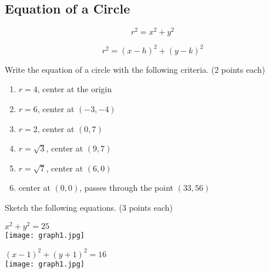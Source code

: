\documentclass[12pt]{article}
\begin{document}
\pagebreak

\subsection*{Equation of a Circle}

$$r^2=x^2+y^2$$

$$r^2=(x-h)^2+(y-k)^2$$

Write the equation of a circle with the following criteria. (2 points each)\\

\begin{enumerate}[resume]

	\item $r=4$, center at the origin\\
	
	\item $r=6$, center at $(-3,-4)$\\
	
	\item $r=2$, center at $(0,7)$\\
	
	\item $r=\sqrt{3}$, center at $(9,7)$\\
	
	\item $r=\sqrt{7}$, center at $(6,0)$\\
	
	\item center at $(0,0)$, passes through the point $(33,56)$\\
	
	
\end{enumerate}

\hrulefill

Sketch the following equations. (3 points each)\\

\begin{enumerate}[resume]
\begin{multicols}{2}

	\item $x^2+y^2=25$\\
	
	\texttt{[image: graph1.jpg]}
	
	\item $(x-1)^2+(y+1)^2=16$\\
	
	\texttt{[image: graph1.jpg]}

\end{multicols}
\end{enumerate}
\end{document}
